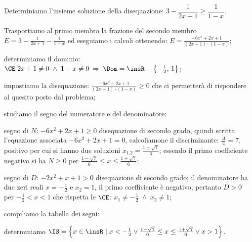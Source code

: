 \begin{exrig}
\begin{esempio}
Determiniamo l'insieme soluzione della disequazione: $3-\dfrac 1{2x+1}\ge \dfrac 1{1-x}$.
\begin{enumeratea}
\item Trasportiamo al primo membro la frazione del secondo membro $E=3-\frac 1{2x+1}-\frac 1{1-x}$ ed eseguiamo i calcoli ottenendo: $E=\frac{-6x^2+2x+1}{(2x+1)\cdot (1-x)}$;
\item determiniamo il dominio: $\CE\; 2x+1\neq 0\;\wedge\; 1-x\neq 0 \:\Rightarrow\: \Dom=\insR-\left\{-\frac 1 2\text{, }1\right\}$;
\item impostiamo la disequazione: $\frac{-6x^2+2x+1}{(2x+1)\cdot (1-x)}\ge 0$ che ci permetterà di rispondere al quesito posto dal problema;
\item studiamo il segno del numeratore e del denominatore:
\begin{itemize*}
\item segno di $N$: $-6x^2+2x+1\ge 0$ disequazione di secondo grado, quindi scritta l'equazione associata $-6x^2+2x+1=0$, calcoliamone il discriminante: $\frac{\Delta } 4=7$, positivo per cui si hanno due soluzioni $x_{1\text{,}2}=\frac{1\pm \sqrt 7} 6$; essendo il primo coefficiente negativo si ha $N\ge 0$ per $\frac{1-\sqrt 7} 6\le x\le \frac{1+\sqrt 7} 6$;
\item segno di $D$: $-2x^2+x+1>0$ disequazione di secondo grado; il denominatore ha due zeri reali $x=-\frac 1 2$ e $x_2=1$, il primo coefficiente è negativo, pertanto $D>0$ per $-\frac 1 2<x<1$ che rispetta le $\CE$: $x_1\neq -\frac 1 2\;\wedge\; x_2\neq 1$;
\end{itemize*}
\item compiliamo la tabella dei segni:
\begin{center}
 
\end{center}
\item determiniamo $\IS=\left\{x\in \insR \mid x<-\frac 1 2\vee \frac{1-\sqrt 7} 6\le x\le \frac{1+\sqrt 7} 6\vee x>1\right\}$.
\end{enumeratea}
\end{esempio}
\end{exrig}

\vspazio\ovalbox{\risolvii \ref{ese:4.51}, \ref{ese:4.52}, \ref{ese:4.53}, \ref{ese:4.54}, \ref{ese:4.55}, \ref{ese:4.56}, \ref{ese:4.57}, \ref{ese:4.58}, \ref{ese:4.59}, \ref{ese:4.60}, \ref{ese:4.61}, \ref{ese:4.62}, \ref {ese:4.63},}

\vspazio\ovalbox{\ref{ese:4.64}, \ref{ese:4.65}, \ref{ese:4.66}, \ref{ese:4.67}, \ref{ese:4.68}, \ref{ese:4.69}, \ref{ese:4.70}}

